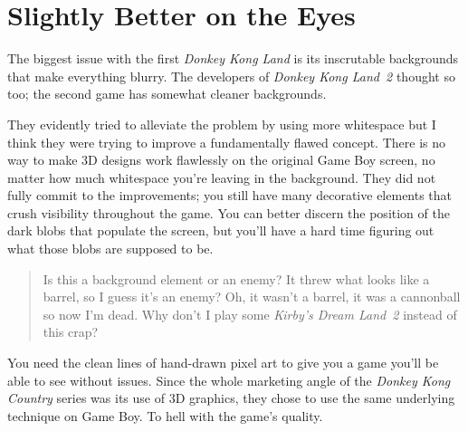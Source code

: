 \documentclass{book}
\let\oldcenter\center
\let\oldendcenter\endcenter
\renewenvironment{center}{\setlength\topsep{0pt}\oldcenter}{\oldendcenter}
\begin{document}
\FloatBarrier\needspace{10mm}\section*{Slightly Better on the Eyes}\nopagebreak[4]

The biggest issue with the first \emph{Donkey Kong Land} is its inscrutable backgrounds that make everything blurry. The developers of \emph{Donkey Kong Land 2} thought so too; the second game has somewhat cleaner backgrounds.

\begin{center}
\vspace{8pt}
\quad\vspace{4pt}
\quad\vspace{4pt}
\quad\vspace{4pt}
\end{center}

They evidently tried to alleviate the problem by using more whitespace but I think they were trying to improve a fundamentally flawed concept. There is no way to make 3D designs work flawlessly on the original Game Boy screen, no matter how much whitespace you’re leaving in the background. They did not fully commit to the improvements; you still have many decorative elements that crush visibility throughout the game. You can better discern the position of the dark blobs that populate the screen, but you’ll have a hard time figuring out what those blobs are supposed to be.

\begin{quote}
Is this a background element or an enemy? It threw what looks like a barrel, so I guess it’s an enemy? Oh, it wasn’t a barrel, it was a cannonball so now I’m dead. Why don’t I play some \emph{Kirby’s Dream Land 2} instead of this crap?
\end{quote} \par

You need the clean lines of hand-drawn pixel art to give you a game you’ll be able to see without issues. Since the whole marketing angle of the \emph{Donkey Kong Country} series was its use of 3D graphics, they chose to use the same underlying technique on Game Boy. To hell with the game’s quality.
\end{document}

